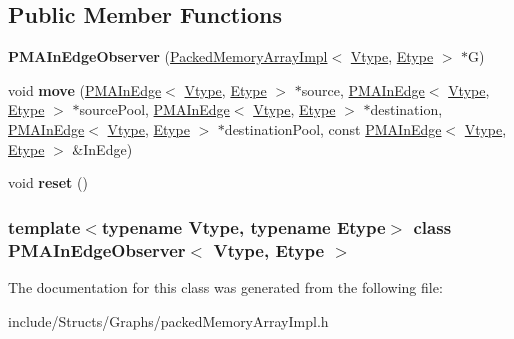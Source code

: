 \subsection*{Public Member Functions}
\begin{DoxyCompactItemize}
\item 
\hypertarget{class_p_m_a_in_edge_observer_acbe8395e534c9752a53f5bf970d8c1f9}{
{\bfseries PMAInEdgeObserver} (\hyperlink{class_packed_memory_array_impl}{PackedMemoryArrayImpl}$<$ \hyperlink{class_vtype}{Vtype}, \hyperlink{class_etype}{Etype} $>$ $\ast$G)}
\label{class_p_m_a_in_edge_observer_acbe8395e534c9752a53f5bf970d8c1f9}

\item 
\hypertarget{class_p_m_a_in_edge_observer_ad4760c57bebc39c0c3602d1c73ff4829}{
void {\bfseries move} (\hyperlink{class_p_m_a_in_edge}{PMAInEdge}$<$ \hyperlink{class_vtype}{Vtype}, \hyperlink{class_etype}{Etype} $>$ $\ast$source, \hyperlink{class_p_m_a_in_edge}{PMAInEdge}$<$ \hyperlink{class_vtype}{Vtype}, \hyperlink{class_etype}{Etype} $>$ $\ast$sourcePool, \hyperlink{class_p_m_a_in_edge}{PMAInEdge}$<$ \hyperlink{class_vtype}{Vtype}, \hyperlink{class_etype}{Etype} $>$ $\ast$destination, \hyperlink{class_p_m_a_in_edge}{PMAInEdge}$<$ \hyperlink{class_vtype}{Vtype}, \hyperlink{class_etype}{Etype} $>$ $\ast$destinationPool, const \hyperlink{class_p_m_a_in_edge}{PMAInEdge}$<$ \hyperlink{class_vtype}{Vtype}, \hyperlink{class_etype}{Etype} $>$ \&InEdge)}
\label{class_p_m_a_in_edge_observer_ad4760c57bebc39c0c3602d1c73ff4829}

\item 
\hypertarget{class_p_m_a_in_edge_observer_ac39bc236d8c41285e096641e5bd1e7d3}{
void {\bfseries reset} ()}
\label{class_p_m_a_in_edge_observer_ac39bc236d8c41285e096641e5bd1e7d3}

\end{DoxyCompactItemize}
\subsubsection*{template$<$typename Vtype, typename Etype$>$ class PMAInEdgeObserver$<$ Vtype, Etype $>$}



The documentation for this class was generated from the following file:\begin{DoxyCompactItemize}
\item 
include/Structs/Graphs/packedMemoryArrayImpl.h\end{DoxyCompactItemize}
